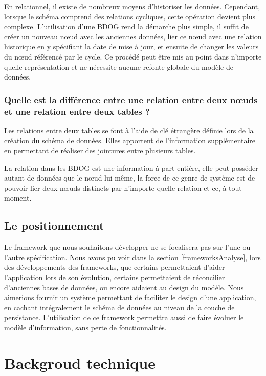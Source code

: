 \documentclass[a4paper,fleqn,12pt,oneside]{report}
\begin{document}
En relationnel, il existe de nombreux moyens d’historiser les données. Cependant, lorsque le schéma comprend des relations cycliques, cette opération devient plus complexe. L’utilisation d’une BDOG rend la démarche plus simple, il suffit de créer un nouveau nœud avec les anciennes données, lier ce nœud avec une relation historique en y spécifiant la date de mise à jour, et ensuite de changer les valeurs du nœud référencé par le cycle. Ce procédé peut être mis au point dans n’importe quelle représentation et ne nécessite aucune refonte globale du modèle de données.\cite{NoSQLVsSGBDR}\label{noSqlVSRel}

\subsection*{Quelle est la différence entre une relation entre deux nœuds et une relation entre deux tables ?}
Les relations entre deux tables se font à l’aide de clé étrangère définie lors de la création du schéma de données. Elles apportent de l’information supplémentaire en permettant de réaliser des jointures entre plusieurs tables.

La relation dans les BDOG est une information à part entière, elle peut posséder autant de données que le nœud lui-même, la force de ce genre de système est de pouvoir lier deux nœuds distincts par n’importe quelle relation et ce, à tout moment.\cite{NoSQLVsSGBDR}

\section{Le positionnement}


Le framework que nous souhaitons développer ne se focalisera pas sur l’une ou l’autre spécification. Nous avons pu voir dans la section \ref{frameworksAnalyse}, lors des développements des frameworks, que certains permettaient d’aider l’application lors de son évolution, certains permettaient de réconcilier d’anciennes bases de données, ou encore aidaient au design du modèle. Nous aimerions fournir un système permettant de faciliter le design d’une application, en cachant intégralement le schéma de données au niveau de la couche de persistance. L’utilisation de ce framework permettra aussi de faire évoluer le modèle d’information, sans perte de fonctionnalités.


\chapter{Backgroud technique}
\end{document}
